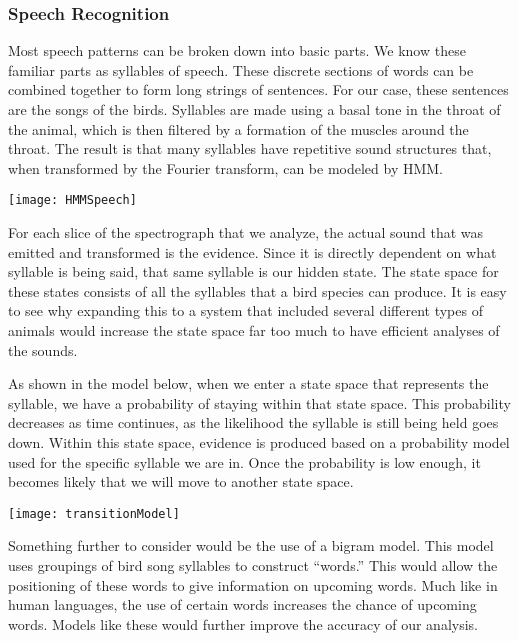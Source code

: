 \subsubsection{Speech Recognition}
Most speech patterns can be broken down into basic parts. We know these familiar parts as syllables of speech. These discrete sections of words can be combined together to form long strings of sentences. For our case, these sentences are the songs of the birds. Syllables are made using a basal tone in the throat of the animal, which is then filtered by a formation of the muscles around the throat. The result is that many syllables have repetitive sound structures that, when transformed by the Fourier transform, can be modeled by HMM.\par

\begin{center}
  \texttt{[image: HMMSpeech]}
\end{center}

For each slice of the spectrograph that we analyze, the actual sound that was emitted and transformed is the evidence. Since it is directly dependent on what syllable is being said, that same syllable is our hidden state. The state space for these states consists of all the syllables that a bird species can produce. It is easy to see why expanding this to a system that included several different types of animals would increase the state space far too much to have efficient analyses of the sounds.\par
As shown in the model below, when we enter a state space that represents the syllable, we have a probability of staying within that state space. This probability decreases as time continues, as the likelihood the syllable is still being held goes down. Within this state space, evidence is produced based on a probability model used for the specific syllable we are in. Once the probability is low enough, it becomes likely that we will move to another state space.\par

\begin{center}
  \texttt{[image: transitionModel]}
\end{center}

Something further to consider would be the use of a bigram model. This model uses groupings of bird song syllables to construct ``words.'' This would allow the positioning of these words to give information on upcoming words. Much like in human languages, the use of certain words increases the chance of upcoming words. Models like these would further improve the accuracy of our analysis.
